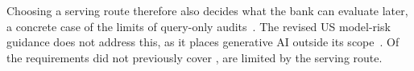 Choosing a serving route therefore also decides what the bank can evaluate later, a concrete case of the limits of query-only audits~\cite{casper2024blackbox}.
The revised US model-risk guidance does not address this, as it places generative AI outside its scope~\cite{federalreserve2026sr262}.
Of the requirements \aicc{} did not previously cover ,  are limited by the serving route.
